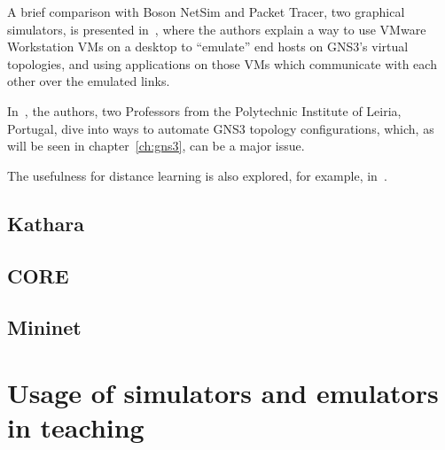 A brief comparison with Boson NetSim and Packet Tracer, two graphical simulators, is presented in~\cite{virtlabgnsvmware}, where the authors explain a way to use VMware Workstation VMs on a desktop to ``emulate'' end hosts on GNS3's virtual topologies, and using applications on those VMs which communicate with each other over the emulated links.

In~\cite{automaticnetconfiggns}, the authors, two Professors from the Polytechnic Institute of Leiria, Portugal, dive into ways to automate GNS3 topology configurations, which, as will be seen in chapter~\ref{ch:gns3}, can be a major issue. %

The usefulness for distance learning is also explored, for example, in~\cite{networkvirtwithgns}.

\subsection{Kathara}
\label{subsec:relworkkathara}

\subsection{CORE}
\label{subsec:relworkcore}

\subsection{Mininet}
\label{subsec:relworkmininet}

\section{Usage of simulators and emulators in teaching}
\label{sec:simemulusage}

